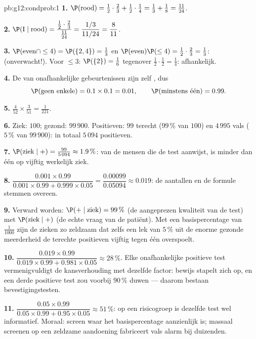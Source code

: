 \begin{solution}{pb:g12:condprob:1}
\textbf{1.} $\P(\text{rood}) = \frac12 \cdot \frac23 + \frac12 \cdot \frac14 =
\frac13 + \frac18 = \frac{11}{24}$.

\textbf{2.} $\P(\text{I} \mid \text{rood}) =
\dfrac{\frac12 \cdot \frac23}{\frac{11}{24}} = \dfrac{1/3}{11/24} =
\dfrac{8}{11}$.

\textbf{3.} $\P(\text{even} \cap \leq 4) = \P(\{2, 4\}) = \frac13$ en
$\P(\text{even})\P(\leq 4) = \frac12 \cdot \frac23 = \frac13$: 
(onverwacht!). Voor $\leq 3$: $\P(\{2\}) = \frac16$ tegenover
$\frac12 \cdot \frac12 = \frac14$: afhankelijk.

\textbf{4.} De  van onafhankelijke gebeurtenissen zijn zelf
, dus
\[
\P(\text{geen enkele}) = 0.1 \times 0.1 = 0.01,
\qquad
\P(\text{minstens één}) = 0.99 .
\]

\textbf{5.} $\frac{4}{52} \times \frac{3}{51} = \frac{1}{221}$.

\textbf{6.} Ziek: $100$; gezond: $99\,900$. Positieven: $99$ terecht
($99\,\%$ van $100$) en $4\,995$ vals ($5\,\%$ van $99\,900$): in totaal
$5\,094$ positieven.

\textbf{7.} $\P(\text{ziek} \mid +) = \frac{99}{5\,094} \approx 1.9\,\%$: van
de mensen die de test aanwijst, is minder dan één op vijftig werkelijk ziek.

\textbf{8.} $\dfrac{0.001 \times 0.99}{0.001 \times 0.99 +
0.999 \times 0.05} = \dfrac{0.00099}{0.05094} \approx 0.019$: de aantallen en
de formule stemmen overeen.

\textbf{9.} Verward worden: $\P(+ \mid \text{ziek}) = 99\,\%$ (de
aangeprezen kwaliteit van de test) met $\P(\text{ziek} \mid +)$ (de echte
vraag van de patiënt). Met een basispercentage van $\frac{1}{1000}$ zijn de
zieken zo zeldzaam dat zelfs een lek van $5\,\%$ uit de enorme gezonde
meerderheid de terechte positieven vijftig tegen één overspoelt.

\textbf{10.} $\dfrac{0.019 \times 0.99}{0.019 \times 0.99 +
0.981 \times 0.05} \approx 28\,\%$. Elke onafhankelijke positieve test
vermenigvuldigt de kansverhouding met dezelfde factor: bewijs stapelt zich op,
en een derde positieve test zou voorbij $90\,\%$ duwen --- daarom bestaan
bevestigingstesten.

\textbf{11.} $\dfrac{0.05 \times 0.99}{0.05 \times 0.99 +
0.95 \times 0.05} \approx 51\,\%$: op een risicogroep is dezelfde test wel
informatief. Moraal: screen waar het basispercentage aanzienlijk is; massaal
screenen op een zeldzame aandoening fabriceert vals alarm bij duizenden.


\end{solution}
